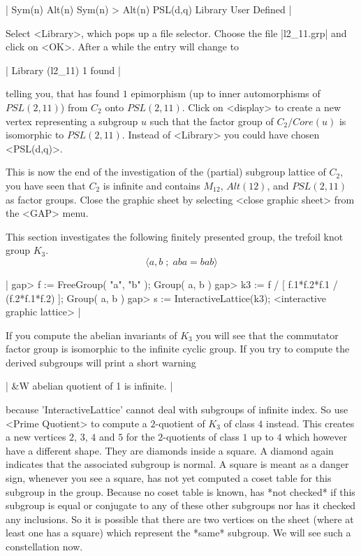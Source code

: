 |    Sym(n)
    Alt(n)
    Sym(n) > Alt(n)
    PSL(d,q)
    Library
    User Defined |

Select  <Library>, which  pops   up a file  selector.   Choose  the  file
|l2_11.grp| and click on <OK>.  After a while the entry will change to

|    Library (l2_11)      1 found |

telling  you,  that  {\GAP}  has   found $1$  epimorphism   (up to  inner
automorphisms  of  $PSL(2,11)$) from  $C_2$   onto $PSL(2,11)$.  Click on
<display> to create a  new vertex representing a  subgroup $u$ such  that
the   factor group of  $C_2  /  Core(u)$  is  isomorphic to  $PSL(2,11)$.
Instead of <Library> you could have chosen <PSL(d,q)>.

This  is now  the  end of  the investigation   of the (partial)  subgroup
lattice  of $C_2$, you have  seen  that $C_2$   is infinite and  contains
$M_{12}$, $Alt(12)$, and $PSL(2,11)$ as factor groups.  Close the graphic
sheet by selecting <close graphic sheet> from the <GAP> menu.


This  section  investigates the  following  finitely presented group, the
trefoil knot group $K_3$.
$$
    \langle a, b \;;\; aba = bab \rangle
$$

|    gap> f := FreeGroup( "a", "b" );
    Group( a, b )
    gap> k3 := f / [ f.1*f.2*f.1 / (f.2*f.1*f.2) ];
    Group( a, b )
    gap> s := InteractiveLattice(k3);
    <interactive graphic lattice> |

If you compute the   abelian invariants of  $K_3$  you will see  that the
commutator factor group  is isomorphic to the  infinite cyclic group.  If
you try  to compute the   derived subgroups  {\GAP}  will print  a  short
warning

|    &W  abelian quotient of 1 is infinite. |

because  'InteractiveLattice'  cannot   deal  with subgroups of  infinite
index.  So  use <Prime Quotient> to   compute a $2$-quotient  of $K_3$ of
class $4$ instead.  This creates a new vertices $2$, $3$, $4$ and $5$ for
the $2$-quotients of  class $1$ up to $4$  which however have a different
shape. They are diamonds inside a square.  A diamond again indicates that
the associated subgroup  is normal.  A square is  meant as a danger sign,
whenever you see a square, {\GAP} has not yet  computed a coset table for
this subgroup in the group.  Because no coset  table is known, {\GAP} has
*not  checked* if this  subgroup is  equal or conjugate   to any of these
other  subgroups nor has  it checked  any  inclusions.  So it is possible
that  there are two  vertices on  the sheet (where    at least one has  a
square) which   represent  the *same* subgroup.    We   will see  such  a
constellation now.

